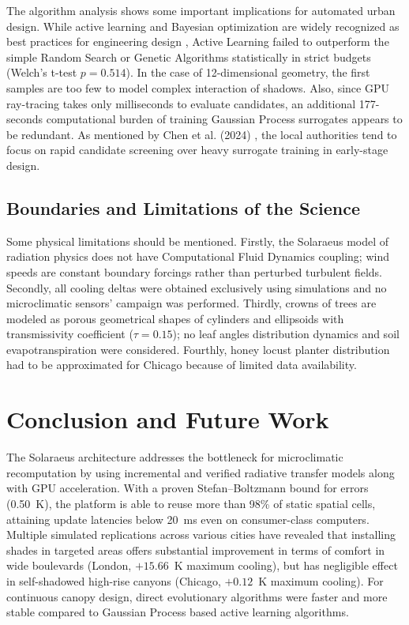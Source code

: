 \documentclass[conference]{IEEEtran}
\begin{document}
The algorithm analysis shows some important implications for automated urban design. While active learning and Bayesian optimization are widely recognized as best practices for engineering design \cite{tao2025integrating,qin2024modeling}, Active Learning failed to outperform the simple Random Search or Genetic Algorithms statistically in strict budgets (Welch’s t-test $p = 0.514$). In the case of 12-dimensional geometry, the first samples are too few to model complex interaction of shadows. Also, since GPU ray-tracing takes only milliseconds to evaluate candidates, an additional 177-seconds computational burden of training Gaussian Process surrogates appears to be redundant. As mentioned by Chen et al. (2024) \cite{chen2024investigating}, the local authorities tend to focus on rapid candidate screening over heavy surrogate training in early-stage design.

\subsection{Boundaries and Limitations of the Science}
Some physical limitations should be mentioned. Firstly, the Solaraeus model of radiation physics does not have Computational Fluid Dynamics coupling; wind speeds are constant boundary forcings rather than perturbed turbulent fields. Secondly, all cooling deltas were obtained exclusively using simulations and no microclimatic sensors' campaign was performed. Thirdly, crowns of trees are modeled as porous geometrical shapes of cylinders and ellipsoids with transmissivity coefficient ($\tau = 0.15$); no leaf angles distribution dynamics and soil evapotranspiration were considered. Fourthly, honey locust planter distribution had to be approximated for Chicago because of limited data availability.

\section{Conclusion and Future Work}

The Solaraeus architecture addresses the bottleneck for microclimatic recomputation by using incremental and verified radiative transfer models along with GPU acceleration. With a proven Stefan--Boltzmann bound for errors (0.50~K), the platform is able to reuse more than 98\% of static spatial cells, attaining update latencies below 20~ms even on consumer-class computers. Multiple simulated replications across various cities have revealed that installing shades in targeted areas offers substantial improvement in terms of comfort in wide boulevards (London, $+15.66$~K maximum cooling), but has negligible effect in self-shadowed high-rise canyons (Chicago, $+0.12$~K maximum cooling). For continuous canopy design, direct evolutionary algorithms were faster and more stable compared to Gaussian Process based active learning algorithms.
\end{document}
